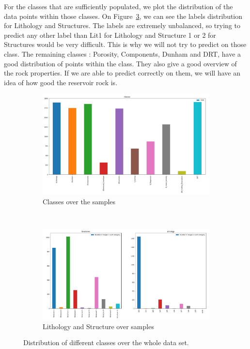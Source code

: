  For the classes that are sufficiently populated, we plot the distribution of the data points within those classes. On Figure~\ref{fig:litandstruct}, we can see the labels distribution for Lithology and Structures. The labels are extremely unbalanced, so trying to predict any other label than Lit1 for Lithology and Structure 1 or 2 for Structures would be very difficult. This is why we will not try to predict on those class. 
 The remaining classes : Porosity, Components, Dunham and DRT, have a good distribution of points within the class. They also give a good overview of the rock properties. If we are able to predict correctly on them, we will have an idea of how good the reservoir rock is. 
\begin{figure}
\begin{subfigure}{1\textwidth}
  \centering
  \includegraphics[width=.8\linewidth]{figures/03-classes.png}
  \caption{Classes over the samples}
  \label{fig:classes}
\end{subfigure}%
\\
\begin{subfigure}{1\textwidth}
  \centering
  \includegraphics[width=.8\linewidth]{figures/03-boob.PNG}
  \caption{Lithology and Structure over samples}
  \label{fig:litandstruct}
\end{subfigure}
\caption[Classes distributions]{Distribution of different classes over the whole data set.}
\end{figure}


